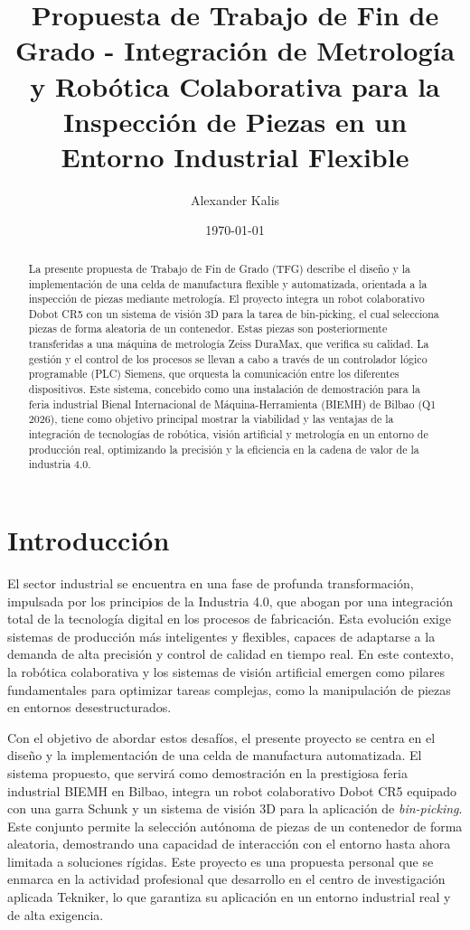 \documentclass[12pt, a4paper]{article}
\title{Propuesta de Trabajo de Fin de Grado - Integración de Metrología y Robótica Colaborativa para la Inspección de Piezas en un Entorno Industrial Flexible}
\author{Alexander Kalis}
\date{\today}
\begin{document}
\maketitle
\thispagestyle{empty}
\newpage 

\begin{abstract}
La presente propuesta de Trabajo de Fin de Grado (TFG) describe el diseño y la implementación de una celda de manufactura flexible y automatizada,
orientada a la inspección de piezas mediante metrología. El proyecto integra un robot colaborativo Dobot CR5 con un sistema de visión 
3D para la tarea de bin-picking, el cual selecciona piezas de forma aleatoria de un contenedor. Estas piezas son posteriormente
transferidas a una máquina de metrología Zeiss DuraMax, que verifica su calidad. La gestión y el control de los procesos se llevan
a cabo a través de un controlador lógico programable (PLC) Siemens, que orquesta la comunicación entre los diferentes dispositivos. 
Este sistema, concebido como una instalación de demostración para la feria industrial Bienal Internacional de Máquina-Herramienta (BIEMH) de Bilbao (Q1 2026), tiene como objetivo principal 
mostrar la viabilidad y las ventajas de la integración de tecnologías de robótica, visión artificial y metrología en un entorno de
producción real, optimizando la precisión y la eficiencia en la cadena de valor de la industria 4.0.
\end{abstract}

\newpage
\tableofcontents
\newpage
\section{Introducción}
El sector industrial se encuentra en una fase de profunda transformación, impulsada por los principios de la Industria 4.0, que abogan por una integración total de la tecnología digital en los procesos de fabricación. Esta evolución exige sistemas de producción más inteligentes y flexibles, capaces de adaptarse a la demanda de alta precisión y control de calidad en tiempo real. En este contexto, la robótica colaborativa y los sistemas de visión artificial emergen como pilares fundamentales para optimizar tareas complejas, como la manipulación de piezas en entornos desestructurados.

Con el objetivo de abordar estos desafíos, el presente proyecto se centra en el diseño y la implementación de una celda de manufactura automatizada. El sistema propuesto, que servirá como demostración en la prestigiosa feria industrial BIEMH en Bilbao, integra un robot colaborativo Dobot CR5 equipado con una garra Schunk y un sistema de visión 3D para la aplicación de \textit{bin-picking}. Este conjunto permite la selección autónoma de piezas de un contenedor de forma aleatoria, demostrando una capacidad de interacción con el entorno hasta ahora limitada a soluciones rígidas. Este proyecto es una propuesta personal que se enmarca en la actividad profesional que desarrollo en el centro de investigación aplicada Tekniker, lo que garantiza su aplicación en un entorno industrial real y de alta exigencia.
\end{document}
